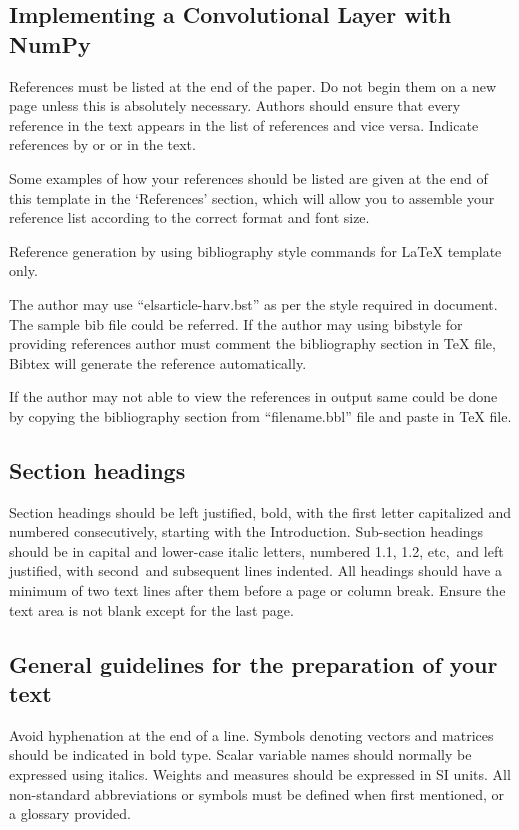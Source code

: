 \documentclass[3p,times,procedia]{elsarticle}
\begin{document}

\subsection{Implementing a Convolutional Layer with NumPy}



References must be listed at the end of the paper. Do not begin them on a new page unless this is absolutely necessary. Authors should ensure that every reference in the text appears in the list of references and vice versa. Indicate references by \cite{Massimo2011} or \cite{Massimo2012} or \cite{Thomas2015} in the text. 

Some examples of how your references should be listed are given at the end of this template in the `References' section, which will allow you to assemble your reference list according to the correct format and font size.

Reference generation by using bibliography style commands for LaTeX template only.

The author may use ``elsarticle-harv.bst'' as per the style required in document. The sample bib file could be referred. 
If the author may using bibstyle for providing references author must comment the bibliography section in TeX file, Bibtex will generate the reference automatically.

If the author may not able to view the references in output same could be done by copying the bibliography section from ``filename.bbl'' file and paste in TeX file.



\subsection{Section headings}
Section headings should be left justified, bold, with the first letter capitalized and numbered consecutively, starting with the Introduction. Sub-section headings should be in capital and lower-case italic letters, numbered 1.1, 1.2, etc,~and left justified, with second~and subsequent lines indented. All headings should have a minimum of two text lines after them before a page or column break.
Ensure the text area is not blank except for the last page.

\subsection{General guidelines for the preparation of your text}
Avoid hyphenation at the end of a line. Symbols denoting vectors and matrices should be indicated in bold type. Scalar variable names should normally be expressed using italics. Weights and measures should be expressed in SI units. All non-standard abbreviations or symbols must be defined when first mentioned, or a glossary provided.
\end{document}
